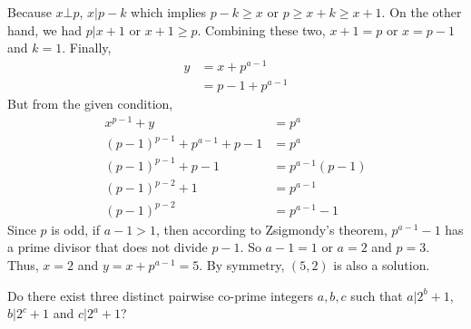 \documentclass[problems.tex]{subfile}
\begin{document}
\begin{solution}
		Because $x\bot p$, $x|p-k$ which implies $p-k\geq x$ or $p\geq x+k\geq x+1$. On the other hand, we had $p|x+1$ or $x+1\geq p$. Combining these two, $x+1=p$ or $x=p-1$ and $k=1$. Finally,
			\begin{align*}
				y & = x+p^{a-1}\\
				  & = p-1+p^{a-1}
			\end{align*}
		But from the given condition,
			\begin{align*}
				x^{p-1}+y & = p^a\\
				(p-1)^{p-1}+p^{a-1}+p-1 & = p^a\\
				(p-1)^{p-1}+p-1 & = p^{a-1}(p-1)\\
				(p-1)^{p-2}+1 & = p^{a-1}\\
				(p-1)^{p-2} & = p^{a-1}-1
			\end{align*}
		Since $p$ is odd, if $a-1>1$, then according to Zsigmondy's theorem, $p^{a-1}-1$ has a prime divisor that does not divide $p-1$. So $a-1=1$ or $a=2$ and $p=3$. Thus, $x=2$ and $y=x+p^{a-1}=5$. By symmetry, $(5,2)$ is also a solution.
	\end{solution}
	
	\begin{problem}[Russia $2000$]
		Do there exist three distinct pairwise co-prime integers $a,b,c$ such that $a|2^b+1$, $b|2^c+1$ and $c|2^a+1$?
	\end{problem}
	
\end{document}
